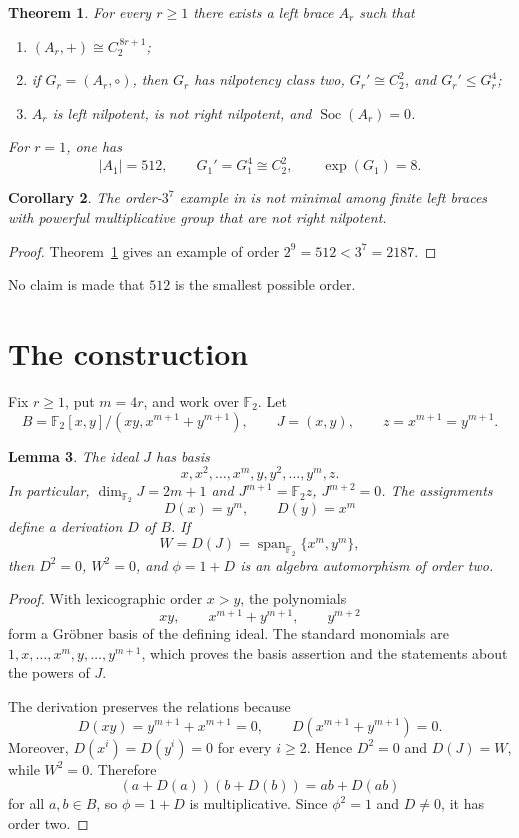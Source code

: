 \documentclass[11pt]{amsart}
\newtheorem{theorem}{Theorem}
\newtheorem{lemma}[theorem]{Lemma}
\newtheorem{corollary}[theorem]{Corollary}
\newcommand{\F}{\mathbb{F}}
\newcommand{\Span}{\operatorname{span}}
\newcommand{\Soc}{\operatorname{Soc}}
\begin{document}
\begin{theorem}\label{thm:main}
For every $r\geq1$ there exists a left brace $A_r$ such that
\begin{enumerate}
  \item $(A_r,+)\cong C_2^{\,8r+1}$;
  \item if $G_r=(A_r,\circ)$, then $G_r$ has nilpotency class two,
        $G_r'\cong C_2^2$, and $G_r'\leq G_r^4$;
  \item $A_r$ is left nilpotent, is not right nilpotent, and
        $\Soc(A_r)=0$.
\end{enumerate}
For $r=1$, one has
\[
 |A_1|=512,
 \qquad
 G_1'=G_1^4\cong C_2^2,
 \qquad
 \operatorname{exp}(G_1)=8.
\]
\end{theorem}

\begin{corollary}\label{cor:order}
The order-$3^7$ example in \cite{Verbeken} is not minimal among finite left
braces with powerful multiplicative group that are not right nilpotent.
\end{corollary}

\begin{proof}
Theorem~\ref{thm:main} gives an example of order
$2^9=512<3^7=2187$.
\end{proof}

No claim is made that $512$ is the smallest possible order.

\section{The construction}

Fix $r\geq1$, put $m=4r$, and work over $\F_2$. Let
\[
 B=\F_2[x,y]/(xy,x^{m+1}+y^{m+1}),
 \qquad
 J=(x,y),
 \qquad
 z=x^{m+1}=y^{m+1}.
\]

\begin{lemma}\label{lem:algebra}
The ideal $J$ has basis
\[
 x,x^2,\ldots,x^m,
 y,y^2,\ldots,y^m,z.
\]
In particular, $\dim_{\F_2}J=2m+1$ and
$J^{m+1}=\F_2z$, $J^{m+2}=0$.
The assignments
\[
 D(x)=y^m,
 \qquad
 D(y)=x^m
\]
define a derivation $D$ of $B$. If
\[
 W=D(J)=\Span_{\F_2}\{x^m,y^m\},
\]
then $D^2=0$, $W^2=0$, and $\phi=1+D$ is an algebra automorphism of order
two.
\end{lemma}

\begin{proof}
With lexicographic order $x>y$, the polynomials
\[
 xy,\qquad x^{m+1}+y^{m+1},\qquad y^{m+2}
\]
form a Gr\"obner basis of the defining ideal. The standard monomials are
$1,x,\ldots,x^m,y,\ldots,y^{m+1}$, which proves the basis assertion and the
statements about the powers of $J$.

The derivation preserves the relations because
\[
 D(xy)=y^{m+1}+x^{m+1}=0,
 \qquad
 D(x^{m+1}+y^{m+1})=0.
\]
Moreover, $D(x^i)=D(y^i)=0$ for every $i\geq2$. Hence $D^2=0$ and
$D(J)=W$, while $W^2=0$. Therefore
\[
 (a+D(a))(b+D(b))=ab+D(ab)
\]
for all $a,b\in B$, so $\phi=1+D$ is multiplicative. Since $\phi^2=1$ and
$D\neq0$, it has order two.
\end{proof}
\end{document}
